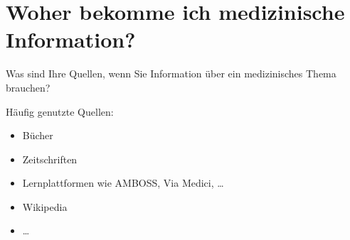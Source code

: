 \documentclass{beamer}
\begin{document}


\section{Woher bekomme ich medizinische Information? }

\begin{frame}{Was sind Ihre Quellen, wenn Sie Information über ein medizinisches Thema brauchen?}

\pause

Häufig genutzte Quellen:

 \begin{itemize}
     \item 
Bücher
\item 
Zeitschriften
\item      
Lernplattformen wie AMBOSS, Via Medici, \dots
     \item 
     Wikipedia
     \item 
     \dots
 \end{itemize}

\end{frame}
\end{document}
